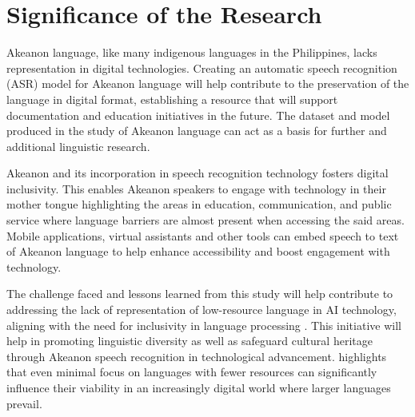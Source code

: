 \section{Significance of the Research}
\label{sec:significance}

Akeanon language, like many indigenous languages in the Philippines, lacks representation in digital technologies. Creating an automatic speech recognition (ASR) model for Akeanon language will help contribute to the preservation of the language in digital format, establishing a resource that will support documentation and education initiatives in the future. The dataset and model produced in the study of Akeanon language can act as a basis for further and additional linguistic research.

Akeanon and its incorporation in speech recognition technology fosters digital inclusivity. This enables Akeanon speakers to engage with technology in their mother tongue highlighting the areas in education, communication, and public service where language barriers are almost present when accessing the said areas. Mobile applications, virtual assistants and other tools can embed speech to text of Akeanon language to help enhance accessibility and boost engagement with technology.

The challenge faced and lessons learned from this study will help contribute to addressing the lack of representation of low-resource language in AI technology, aligning with the need for inclusivity in language processing \cite{Poupard:2024}. This initiative will help in promoting linguistic diversity as well as safeguard cultural heritage through Akeanon speech recognition in technological advancement.  highlights that even minimal focus on languages with fewer resources can significantly influence their viability in an increasingly digital world where larger languages prevail.



